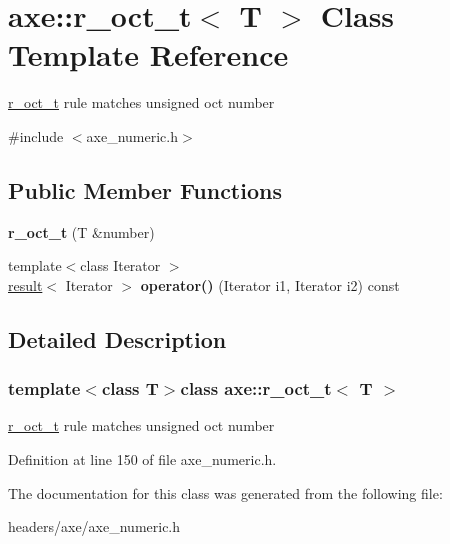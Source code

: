 \hypertarget{classaxe_1_1r__oct__t}{\section{axe\+:\+:r\+\_\+oct\+\_\+t$<$ T $>$ Class Template Reference}
\label{classaxe_1_1r__oct__t}
}


\hyperlink{classaxe_1_1r__oct__t}{r\+\_\+oct\+\_\+t} rule matches unsigned oct number  




{\ttfamily \#include $<$axe\+\_\+numeric.\+h$>$}

\subsection*{Public Member Functions}
\begin{DoxyCompactItemize}
\item 
\hypertarget{classaxe_1_1r__oct__t_a33940e9801cb478d27ef482cdb430f44}{{\bfseries r\+\_\+oct\+\_\+t} (T \&number)}\label{classaxe_1_1r__oct__t_a33940e9801cb478d27ef482cdb430f44}

\item 
\hypertarget{classaxe_1_1r__oct__t_a75183fcdfbcd0987e2165135f3b9b8b0}{{\footnotesize template$<$class Iterator $>$ }\\\hyperlink{structaxe_1_1result}{result}$<$ Iterator $>$ {\bfseries operator()} (Iterator i1, Iterator i2) const }\label{classaxe_1_1r__oct__t_a75183fcdfbcd0987e2165135f3b9b8b0}

\end{DoxyCompactItemize}


\subsection{Detailed Description}
\subsubsection*{template$<$class T$>$class axe\+::r\+\_\+oct\+\_\+t$<$ T $>$}

\hyperlink{classaxe_1_1r__oct__t}{r\+\_\+oct\+\_\+t} rule matches unsigned oct number 

Definition at line 150 of file axe\+\_\+numeric.\+h.



The documentation for this class was generated from the following file\+:\begin{DoxyCompactItemize}
\item 
headers/axe/axe\+\_\+numeric.\+h\end{DoxyCompactItemize}
